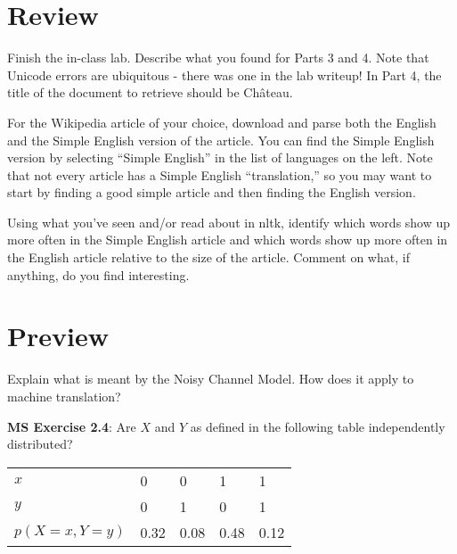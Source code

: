 \documentclass[11pt,letterpaper,boxed]{hmcpset}
\begin{document}
\section*{Review} 
\begin{problem}
Finish the in-class lab. Describe what you found for Parts 3 and
4. Note that Unicode errors are ubiquitous - there was one in the lab
writeup! In Part 4, the title of the document to retrieve should be Château.
\end{problem}

\begin{solution}
\vspace{6cm}
\end{solution}
 
\begin{problem}
For the Wikipedia article of your choice, download and parse both the
English and the Simple English version of the article. You can find
the Simple English version by selecting ``Simple English'' in the list
of languages on the left. Note that not every article has a Simple
English ``translation,'' so you may want to start by finding a good
simple article and then finding the English version. 

Using what you've seen and/or read about in nltk, identify which words
show up more often in the Simple English article and which words show
up more often in the English article relative to the size of the
article. Comment on what, if anything, do you find interesting.
\end{problem}
\begin{solution}
\vspace{6cm}
\end{solution}

\pagebreak

\section*{Preview} 

\begin{problem}
Explain what is meant by the Noisy Channel Model. How does it apply to
machine translation?
\end{problem}
\begin{solution}
\vspace{10cm}
\end{solution}

\begin{problem}
\textbf{MS Exercise 2.4}: Are $X$ and $Y$ as defined in the following
table independently distributed? 
\begin{tabular}{|l|l|l|l|l|}
\hline
$x$ & 0 & 0 & 1 & 1 \\
$y$ & 0 & 1 & 0 & 1 \\
$p(X=x,Y=y)$ & 0.32 & 0.08 & 0.48 & 0.12 \\
\hline
\end{tabular}
\end{problem}
\begin{solution}
\vspace{9cm}
\end{solution}
\end{document}
